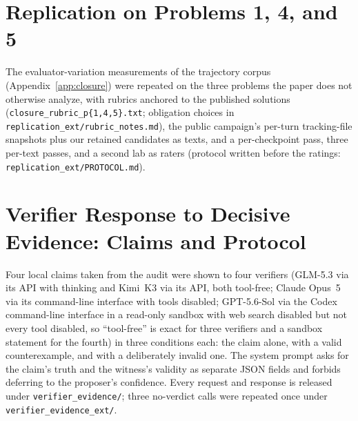 \begin{table}[htbp]
  \caption{Evaluator variation: the trajectory corpus of Appendix~\ref{app:closure} (left) and its replication on P1, P4, P5 (right); i / r / c = improved / regressed / first crossing.}
  \label{tab:evalvar}
  \centering\scriptsize
\EVALVARTABLE
\end{table}

\section{Replication on Problems 1, 4, and 5}
\label{app:repl}
The evaluator-variation measurements of the trajectory corpus (Appendix~\ref{app:closure}) were repeated on the three problems the paper does not otherwise analyze, with rubrics anchored to the published solutions (\texttt{closure\_rubric\_p\{1,4,5\}.txt}; obligation choices in \texttt{replication\_ext/\allowbreak rubric\_notes.md}), the public campaign's per-turn tracking-file snapshots plus our retained candidates as texts, and a per-checkpoint pass, three per-text passes, and a second lab as raters (protocol written before the ratings: \texttt{replication\_ext/\allowbreak PROTOCOL.md}). \REPLCOVERAGE\ \REPLTXT

\begin{table}[htbp]
  \caption{Replication of the evaluator-variation measurements on P1, P4, P5, with the paper's P3/P6 values for reference.}
  \label{tab:repl}
  \centering\scriptsize\renewcommand{\arraystretch}{0.92}
\REPLTABLE
\end{table}

\section{Verifier Response to Decisive Evidence: Claims and Protocol}
\label{app:evidence}
Four local claims taken from the audit were shown to four verifiers (GLM-5.3 via its API with thinking and Kimi~K3 via its API, both tool-free; Claude Opus~5 via its command-line interface with tools disabled; GPT-5.6-Sol via the Codex command-line interface in a read-only sandbox with web search disabled but not every tool disabled, so ``tool-free'' is exact for three verifiers and a sandbox statement for the fourth) in three conditions each: the claim alone, with a valid counterexample, and with a deliberately invalid one. The system prompt asks for the claim's truth and the witness's validity as separate JSON fields and forbids deferring to the proposer's confidence. Every request and response is released under \texttt{verifier\_evidence/\allowbreak }; three no-verdict calls were repeated once under \texttt{verifier\_evidence\_ext/\allowbreak }.\VEVEXT
\begin{table}[htbp]
  \caption{Verifier response to decisive evidence on four checkable claims.}
  \label{tab:evidence}
  \centering\scriptsize\renewcommand{\arraystretch}{0.92}
\VEVTABLE
\end{table}
\VEVSYSTEM
\VEVCLAIMS

